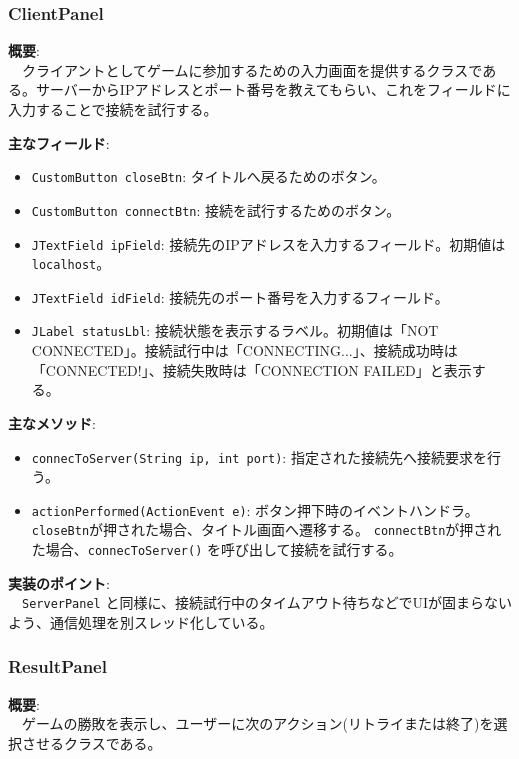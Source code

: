 \documentclass[11pt,a4j]{jarticle}
\begin{document}
\subsubsection{ClientPanel}
\noindent\textbf{概要}: \\
　クライアントとしてゲームに参加するための入力画面を提供するクラスである。サーバーからIPアドレスとポート番号を教えてもらい、これをフィールドに入力することで接続を試行する。

\noindent\textbf{主なフィールド}:
\begin{itemize}
    \item \texttt{CustomButton closeBtn}: タイトルへ戻るためのボタン。
    \item \texttt{CustomButton connectBtn}: 接続を試行するためのボタン。
    \item \texttt{JTextField ipField}: 接続先のIPアドレスを入力するフィールド。初期値は\texttt{localhost}。
    \item \texttt{JTextField idField}: 接続先のポート番号を入力するフィールド。
    \item \texttt{JLabel statusLbl}: 接続状態を表示するラベル。初期値は「NOT CONNECTED」。接続試行中は「CONNECTING...」、接続成功時は「CONNECTED!」、接続失敗時は「CONNECTION FAILED」と表示する。
\end{itemize}

\noindent\textbf{主なメソッド}:
\begin{itemize}
    \item \texttt{connecToServer(String ip, int port)}: 指定された接続先へ接続要求を行う。
    \item \texttt{actionPerformed(ActionEvent e)}: ボタン押下時のイベントハンドラ。\texttt{closeBtn}が押された場合、タイトル画面へ遷移する。 \texttt{connectBtn}が押された場合、\texttt{connecToServer()} を呼び出して接続を試行する。
\end{itemize}

\noindent\textbf{実装のポイント}: \\
　\texttt{ServerPanel} と同様に、接続試行中のタイムアウト待ちなどでUIが固まらないよう、通信処理を別スレッド化している。

\subsubsection{ResultPanel}

\noindent\textbf{概要}: \\
　ゲームの勝敗を表示し、ユーザーに次のアクション(リトライまたは終了)を選択させるクラスである。
\end{document}
